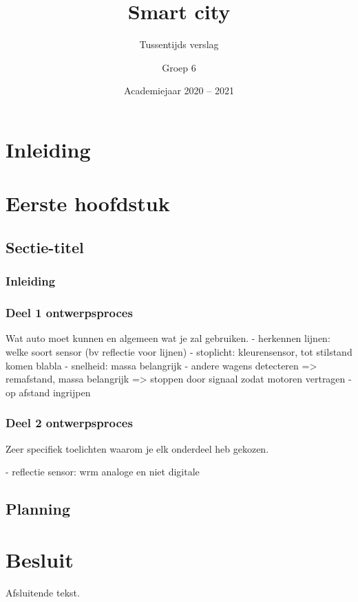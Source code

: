 \documentclass[a4paper,twoside,kulak]{kulakreport} %
\title{Smart city}
\subtitle{Tussentijds verslag}
\author{Groep 6}
\institute{KU Leuven Kulak, Wetenschap \& Technologie}
\date{Academiejaar 2020 -- 2021}
\begin{document}

\titlepage

\tableofcontents

\chapter*{Inleiding}

\chapter{Eerste hoofdstuk}
\section{Sectie-titel}
\subsection*{Inleiding}

\subsection{Deel 1 ontwerpsproces}
Wat auto moet kunnen en algemeen wat je zal gebruiken.
- herkennen lijnen: welke soort sensor (bv reflectie voor lijnen)
- stoplicht: kleurensensor, tot stilstand komen blabla
- snelheid: massa belangrijk
- andere wagens detecteren => remafstand, massa belangrijk => stoppen door signaal zodat motoren vertragen
- op afstand ingrijpen

\subsection{Deel 2 ontwerpsproces}
Zeer specifiek toelichten waarom je elk onderdeel heb gekozen.

- reflectie sensor: wrm analoge en niet digitale



\section{Planning}

\chapter*{Besluit}
Afsluitende tekst.
\end{document}
